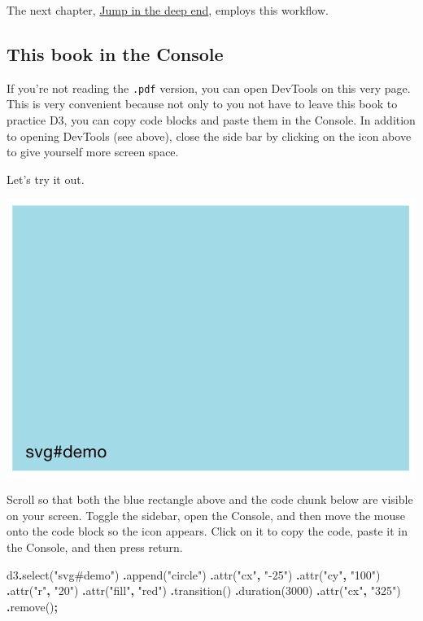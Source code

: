 \documentclass[
  openany]{book}
\newenvironment{Shaded}{\begin{snugshade}}{\end{snugshade}}
\newcommand{\DecValTok}[1]{\textcolor[rgb]{0.00,0.00,0.81}{#1}}
\newcommand{\FunctionTok}[1]{\textcolor[rgb]{0.00,0.00,0.00}{#1}}
\newcommand{\NormalTok}[1]{#1}
\newcommand{\OperatorTok}[1]{\textcolor[rgb]{0.81,0.36,0.00}{\textbf{#1}}}
\newcommand{\StringTok}[1]{\textcolor[rgb]{0.31,0.60,0.02}{#1}}
\begin{document}
The next chapter, \href{jump.html}{Jump in the deep end}, employs this workflow.

\hypertarget{this-book-in-the-console}{%
\subsection{This book in the Console}\label{this-book-in-the-console}}

If you're not reading the \texttt{.pdf} version, you can open DevTools on this very page. This is very convenient because not only to you not have to leave this book to practice D3, you can copy code blocks and paste them in the Console. In addition to opening DevTools (see above), close the side bar by clicking on the icon above to give yourself more screen space.

Let's try it out.

\includegraphics[width=0.33\linewidth]{images/pdfbook/svg1}

Scroll so that both the blue rectangle above and the code chunk below are visible on your screen. Toggle the sidebar, open the Console, and then move the mouse onto the code block so the icon appears. Click on it to copy the code, paste it in the Console, and then press return.

\begin{Shaded}
\begin{Highlighting}[]
\NormalTok{d3}\OperatorTok{.}\FunctionTok{select}\NormalTok{(}\StringTok{"svg\#demo"}\NormalTok{)}
  \OperatorTok{.}\FunctionTok{append}\NormalTok{(}\StringTok{"circle"}\NormalTok{)}
    \OperatorTok{.}\FunctionTok{attr}\NormalTok{(}\StringTok{"cx"}\OperatorTok{,} \StringTok{"{-}25"}\NormalTok{)              }
    \OperatorTok{.}\FunctionTok{attr}\NormalTok{(}\StringTok{"cy"}\OperatorTok{,} \StringTok{"100"}\NormalTok{)}
    \OperatorTok{.}\FunctionTok{attr}\NormalTok{(}\StringTok{"r"}\OperatorTok{,} \StringTok{"20"}\NormalTok{)}
    \OperatorTok{.}\FunctionTok{attr}\NormalTok{(}\StringTok{"fill"}\OperatorTok{,} \StringTok{"red"}\NormalTok{)}
  \OperatorTok{.}\FunctionTok{transition}\NormalTok{()}
  \OperatorTok{.}\FunctionTok{duration}\NormalTok{(}\DecValTok{3000}\NormalTok{)}
    \OperatorTok{.}\FunctionTok{attr}\NormalTok{(}\StringTok{"cx"}\OperatorTok{,} \StringTok{"325"}\NormalTok{)}
  \OperatorTok{.}\FunctionTok{remove}\NormalTok{()}\OperatorTok{;}
\end{Highlighting}
\end{Shaded}
\end{document}
